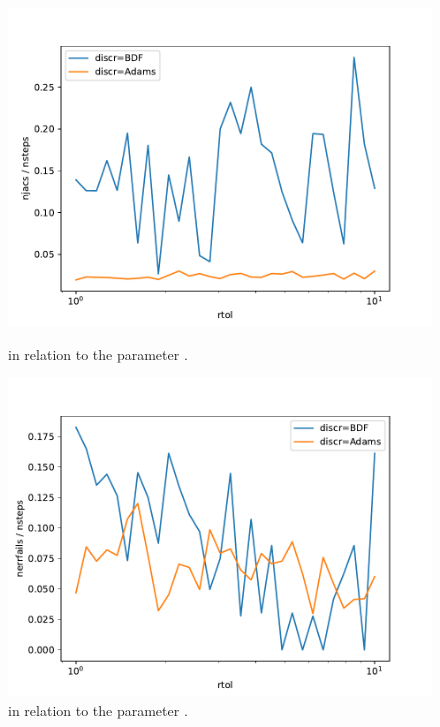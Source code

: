 \documentclass{scrartcl}
\begin{document}
\begin{figure}[h]
\centering
\begin{minipage}[b]{0.45\textwidth}
\centering
\includegraphics[width=\textwidth]{../Plots/Task4/Figure_311}
\caption{ in relation to the parameter .}
\label{pl:njacs_nsteps2}
\end{minipage}
\hfill
\begin{minipage}[b]{0.45\textwidth}
\centering
\includegraphics[width=\textwidth]{../Plots/Task4/Figure_312}
\caption{ in relation to the parameter .}
\label{pl:nerrfails_nsteps2}
\end{minipage}
\end{figure}
\end{document}
